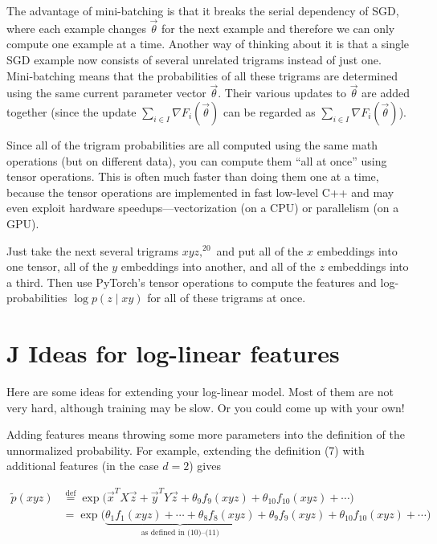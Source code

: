 The advantage of mini-batching is that it breaks the serial dependency of SGD, where each example changes $\vec{\theta}$ for the next example and therefore we can only compute one example at a time. Another way of thinking about it is that a single SGD example now consists of several unrelated trigrams instead of just one. Mini-batching means that the probabilities of all these trigrams are determined using the same current parameter vector $\vec{\theta}$. Their various updates to $\vec{\theta}$ are added together (since the update $\sum_{i \in I} \nabla F_i(\vec{\theta})$ can be regarded as $\sum_{i \in I} \nabla F_i(\vec{\theta})$).

Since all of the trigram probabilities are all computed using the same math operations (but on different data), you can compute them “all at once” using tensor operations. This is often much faster than doing them one at a time, because the tensor operations are implemented in fast low-level C++ and may even exploit hardware speedups—vectorization (on a CPU) or parallelism (on a GPU).

Just take the next several trigrams $xyz,^{20}$ and put all of the $x$ embeddings into one tensor, all of the $y$ embeddings into another, and all of the $z$ embeddings into a third. Then use PyTorch’s tensor operations to compute the features and log-probabilities $\log p(z \mid xy)$ for all of these trigrams at once.

\section*{J Ideas for log-linear features}

Here are some ideas for extending your log-linear model. Most of them are not very hard, although training may be slow. Or you could come up with your own!

Adding features means throwing some more parameters into the definition of the unnormalized probability. For example, extending the definition (7) with additional features (in the case $d=2$) gives

\begin{align}
\tilde{p}(xyz) &\stackrel{\mathrm{def}}{=} \exp\Big(\vec{x}^T X \vec{z} + \vec{y}^T Y \vec{z} + \theta_9 f_9(xyz) + \theta_{10} f_{10}(xyz) + \cdots \Big) \\
&= \exp\Bigg(\underbrace{\theta_1 f_1(xyz) + \cdots + \theta_8 f_8(xyz)}_{\text{as defined in (10)--(11)}} + \theta_9 f_9(xyz) + \theta_{10} f_{10}(xyz) + \cdots \Bigg)
\end{align}

